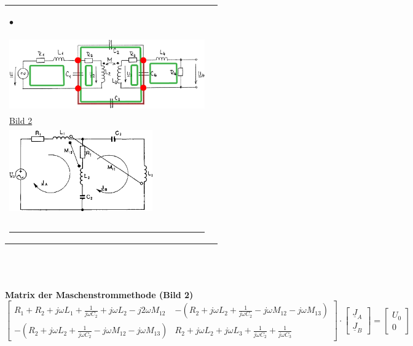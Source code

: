 \begin{tabular}{p{9cm}|p{9cm}}
\begin{minipage}{9cm}
\begin{list}{$\bullet$}{\setlength{\itemsep}{0cm} \setlength{\parsep}{0cm} \setlength{\topsep}{0cm}}
	    \end{list}	
    \end{minipage} &
	\begin{minipage}{9cm}
    		\underline{Bild 1}\\
    		\includegraphics[height=3cm]{./images/netzwerkanalyse-kreisstrom2.png}\\
			\underline{Bild 2}\\
			\includegraphics[height=3.5cm]{./images/netzwerkanalyse-maschenstrom.png}\\
    		\\
    		\\
    		\hrule
    \end{minipage}\\
\end{tabular} \\
\\ \\
\textbf{Matrix der Maschenstrommethode (Bild 2)}
$$\left[ \begin{array}{cc}
        R_1+R_2 +j \omega L_1 + \frac{1}{j \omega C_2} + j \omega L_2 - j 2
        \omega M_{12} 
    & -(R_2 + j \omega L_2 + \frac{1}{j \omega C_2} - j \omega M_{12} -
        j \omega M_{13}) \\
    -(R_2 + j \omega L_2 + \frac{1}{j \omega C_2} - j \omega M_{12} - j
        \omega M_{13})
    & R_2 + j \omega L_2 + j \omega L_3 + \frac{1}{j \omega C_2} +
        \frac{1}{j \omega C_3}
\end{array}\right] \cdot
\left[ \begin{array}{cc}
     \underline{J}_A \\ \underline{J}_B
     \end{array}\right] =
\left[ \begin{array}{cc}
     U_0 \\ 0
     \end{array}\right]$$
